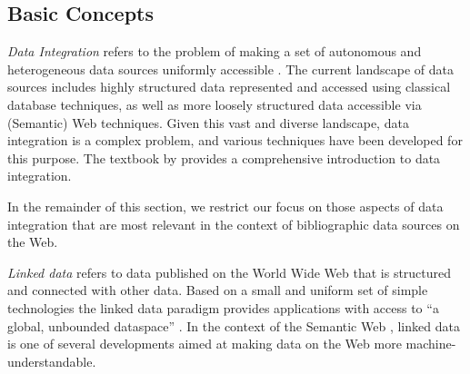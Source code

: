 \subsection{Basic Concepts}

\emph{Data Integration} refers to the problem of making a set of autonomous and heterogeneous data sources
uniformly accessible \autocite[p.6]{Doan2012}.
The current landscape of data sources includes highly structured data
represented and accessed using classical database techniques,
as well as more loosely structured data accessible via (Semantic) Web techniques.
Given this vast and diverse landscape, data integration is a complex problem,
and various techniques have been developed for this purpose.
The textbook by \textcite{Doan2012} provides a
comprehensive introduction to data integration.

In the remainder of this section,
we restrict our focus on those aspects of data integration
that are most relevant in the context of bibliographic data sources on the Web.

\emph{Linked data} \autocite{W3CLinkedData,Domingue2011} refers to data published on the World Wide Web that is structured and connected with other data.
Based on a small and uniform set of simple technologies
the linked data paradigm provides applications with access to \enquote{a global, unbounded dataspace} \autocite{Domingue2011}.
In the context of the Semantic Web \autocite{BernersLee2001,Marshall2003},
linked data is one of several developments aimed at making data on the Web more machine-understandable.

